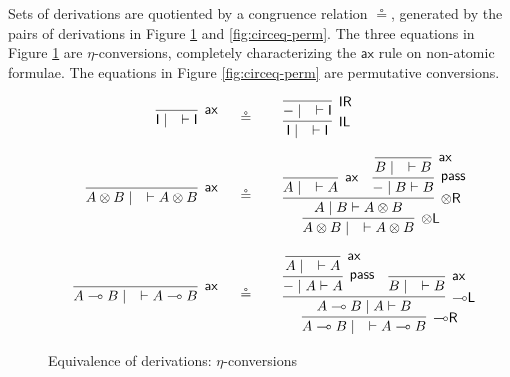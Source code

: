 \documentclass[sn-mathphys-num]{sn-jnl}%
\newcommand{\vd}{\vdash}
\newcommand{\tl}{\otimes \mathsf{L}}
\newcommand{\tr}{\otimes\mathsf{R}}
\newcommand{\pass}{\mathsf{pass}}
\newcommand{\unitl}{\mathsf{IL}}
\newcommand{\unitr}{\mathsf{IR}}
\newcommand{\ax}{\mathsf{ax}}
\newcommand{\ot}{\otimes}
\newcommand{\lolli}{\multimap}
\newcommand{\lleft}{{\lolli}\mathsf{L}}
\newcommand{\lright}{{\lolli}\mathsf{R}}
\newcommand{\unit}{\mathsf{I}}
\newcommand{\proofbox}[1]{\begin{tabular}{l} #1 \end{tabular}}
\theoremstyle{thmstyleone}%
\theoremstyle{thmstyletwo}%
\theoremstyle{thmstylethree}%
\begin{document}
Sets of derivations are quotiented by a congruence relation $\circeq$, generated by the pairs of derivations in Figure \ref{fig:circeqeta} and \ref{fig:circeq-perm}.
The three equations in Figure \ref{fig:circeqeta} are $\eta$-conversions, completely characterizing the $\ax$ rule on non-atomic formulae. The equations in Figure \ref{fig:circeq-perm} are permutative conversions.
\begin{figure}
  \begin{displaymath}
    \begin{array}{rcl}
      \proofbox{
      \infer[\ax]{\unit \mid \quad \vd \unit}{}
      }
      &\circeq&
      \proofbox{
      \infer[\unitl]{\unit \mid \quad \vd \unit}{
      \infer[\unitr]{{-} \mid \quad \vd \unit}{}
      }
      }
      \\[20pt]
      \proofbox{
      \infer[\ax]{A \ot B \mid \quad \vd A \ot B}{}
      }
      &\circeq&
      \proofbox{
      \infer[\tl]{A \ot B \mid \quad \vd A \ot B}{
      \infer[\tr]{A \mid B \vd A \ot B}{
      \infer[\ax]{A \mid \quad \vd A}{}
      &
      \infer[\pass]{{-} \mid B \vd B}{
      \infer[\ax]{B \mid \quad \vd B}{}
      }
      }
      }
      }
      \\[35pt]
      \proofbox{
      \infer[\ax]{A \lolli B \mid \quad \vd A \lolli B}{}
      }
      &\circeq&
      \proofbox{
      \infer[\lright]{A \lolli B \mid \quad \vd A \lolli B}{
      \infer[\lleft]{A \lolli B \mid A \vd B}{
      \infer[\pass]{{-} \mid A \vd A}{
      \infer[\ax]{A \mid \quad \vd A}{}
      }
      &
      \infer[\ax]{B \mid \quad \vd B}{}
      }
      }
      }
    \end{array}
  \end{displaymath}
  \caption{Equivalence of derivations: $\eta$-conversions}
  \label{fig:circeqeta}
\end{figure}
\end{document}
